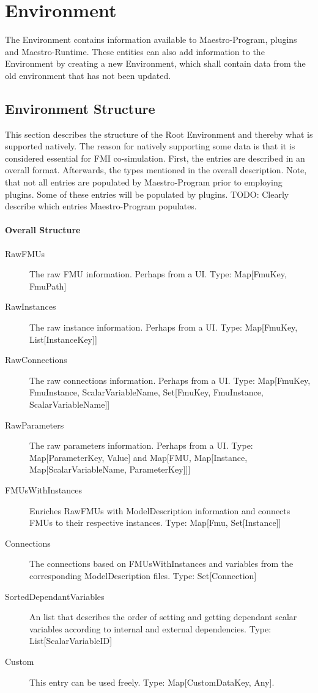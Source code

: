 \section{Environment}
The Environment contains information available to Maestro-Program,
plugins and Maestro-Runtime. These entities can also add information to the
Environment by creating a new Environment, which shall contain data from the old
environment that has not been updated.

\subsection{Environment Structure}
This section describes the structure of the Root Environment and thereby what is
supported natively. The reason for natively supporting some data is that it is
considered essential for FMI co-simulation.
First, the entries are described in an overall format. Afterwards, the types
mentioned in the overall description. Note, that not all entries are populated
by Maestro-Program prior to employing plugins. Some of these entries will be
populated by plugins. TODO: Clearly describe which entries Maestro-Program
populates.
\paragraph{Overall Structure}
\begin{description}
  \item[RawFMUs] The raw FMU information. Perhaps from a UI. Type: Map[FmuKey, FmuPath]
  \item[RawInstances] The raw instance information. Perhaps from a UI. Type: Map[FmuKey, List[InstanceKey]]
  \item[RawConnections] The raw connections information. Perhaps from a UI.
    Type: Map[{FmuKey, FmuInstance, ScalarVariableName}, Set[{FmuKey, FmuInstance, ScalarVariableName}]]
  \item[RawParameters] The raw parameters information. Perhaps from a UI.
    Type: Map[ParameterKey, Value] and Map[FMU, Map[Instance, Map[ScalarVariableName, ParameterKey]]]
  \item[FMUsWithInstances] Enriches RawFMUs with ModelDescription information
    and connects FMUs to their respective instances. Type: Map[Fmu, Set[Instance]]
  \item[Connections] The connections based on FMUsWithInstances and variables
    from the corresponding ModelDescription files. Type: Set[Connection]
  \item[SortedDependantVariables] An list that describes the order of setting
    and getting dependant scalar variables according to internal and external
    dependencies. Type: List[ScalarVariableID]
    \item[Custom] This entry can be used freely. Type: Map[CustomDataKey, Any].
\end{description}

